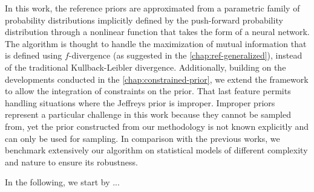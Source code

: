 In this work,
the {reference priors} are approximated from a parametric family of probability distributions implicitly defined by the push-forward probability distribution through a nonlinear function that takes the form of a neural network. %
The algorithm is thought to handle the maximization of mutual information that is defined using $f$-divergence (as suggested in the \cref{chap:ref-generalized}), instead of the traditional Kullback-Leibler divergence.
Additionally, building on the developments conducted in the \cref{chap:constrained-prior}, we extend the framework to allow the integration of constraints on the prior. That last feature permits handling situations where the Jeffreys prior is improper. Improper priors represent a particular challenge in this work because they cannot be sampled from, yet the prior constructed from our methodology is not known explicitly and can only be used for sampling. %
In comparison with the previous works, we benchmark extensively our algorithm on statistical models of different complexity and nature to ensure its robustness.


In the following, we start by ...






